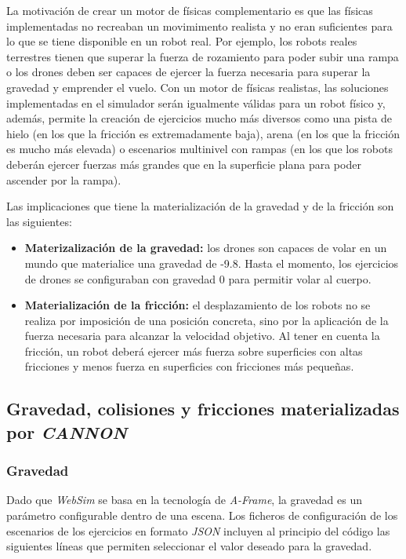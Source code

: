 \normalsize
La motivación de crear un motor de físicas complementario es que las físicas implementadas no recreaban un movimimento realista y no eran suficientes para lo que se tiene disponible en un robot real. Por ejemplo, los robots reales terrestres tienen que superar la fuerza de rozamiento para poder subir una rampa o los drones deben ser capaces de ejercer la fuerza necesaria para superar la gravedad y emprender el vuelo. Con un motor de físicas realistas, las soluciones implementadas en el simulador serán igualmente válidas para un robot físico y, además, permite la creación de ejercicios mucho más diversos como una pista de hielo (en los que la fricción es extremadamente baja), arena (en los que la fricción es mucho más elevada) o escenarios multinivel con rampas (en los que los robots deberán ejercer fuerzas más grandes que en la superficie plana para poder ascender por la rampa). \newline

Las implicaciones que tiene la materialización de la gravedad y de la fricción son las siguientes:

\begin{itemize}
    \item \textbf{Materizalización de la gravedad:} los drones son capaces de volar en un mundo que materialice una gravedad de -9.8. Hasta el momento, los ejercicios de drones se configuraban con gravedad 0 para permitir volar al cuerpo.
    \item \textbf{Materialización de la fricción:} el desplazamiento de los robots no se realiza por imposición de una posición concreta, sino por la aplicación de la fuerza necesaria para alcanzar la velocidad objetivo. Al tener en cuenta la fricción, un robot deberá ejercer más fuerza sobre superficies con altas fricciones y menos fuerza en superficies con fricciones más pequeñas.
\end{itemize}

\subsection{Gravedad, colisiones y fricciones materializadas por \textit{CANNON}}
\subsubsection{Gravedad} 
Dado que \textit{WebSim} se basa en la tecnología de \textit{A-Frame}, la gravedad es un parámetro configurable dentro de una escena. Los ficheros de configuración de los escenarios de los ejercicios en formato \textit{JSON} incluyen al principio del código las siguientes líneas que permiten seleccionar el valor deseado para la gravedad.

